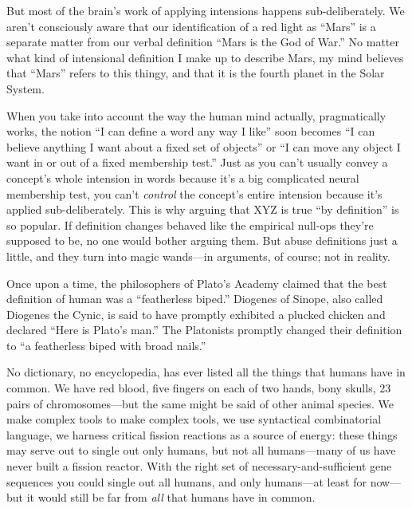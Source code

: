{{{
 But most of the brain's work of applying
intensions happens sub-deliberately. We aren't
consciously aware that our identification of a red light as
``Mars'' is a separate matter from
our verbal definition ``Mars is the God of
War.'' No matter what kind of intensional definition
I make up to describe Mars, my mind believes that
``Mars'' refers to this thingy, and
that it is the fourth planet in the Solar System.}

{
 When you take into account the way the human mind actually,
pragmatically works, the notion ``I can define a word
any way I like'' soon becomes ``I
can believe anything I want about a fixed set of
objects'' or ``I can move any object
I want in or out of a fixed membership test.'' Just
as you can't usually convey a concept's
whole intension in words because it's a big complicated
neural membership test, you can't \textit{control} the
concept's entire intension because it's
applied sub-deliberately. This is why arguing that XYZ is true
``by definition'' is so popular. If
definition changes behaved like the empirical null-ops
they're supposed to be, no one would bother arguing
them. But abuse definitions just a little, and they turn into magic
wands---in arguments, of course; not in reality.}

\myendsectiontext


\bigskip


{
 Once upon a time, the philosophers of Plato's
Academy claimed that the best definition of human was a
``featherless biped.'' Diogenes of
Sinope, also called Diogenes the Cynic, is said to have promptly
exhibited a plucked chicken and declared ``Here is
Plato's man.'' The Platonists
promptly changed their definition to ``a featherless
biped with broad nails.'' }

{
 No dictionary, no encyclopedia, has ever listed all the things
that humans have in common. We have red blood, five fingers on each of
two hands, bony skulls, 23 pairs of chromosomes---but the same might be
said of other animal species. We make complex tools to make complex
tools, we use syntactical combinatorial language, we harness critical
fission reactions as a source of energy: these things may serve out to
single out only humans, but not all humans---many of us have never
built a fission reactor. With the right set of necessary-and-sufficient
gene sequences you could single out all humans, and only humans---at
least for now---but it would still be far from \textit{all} that humans
have in common.}

}}
